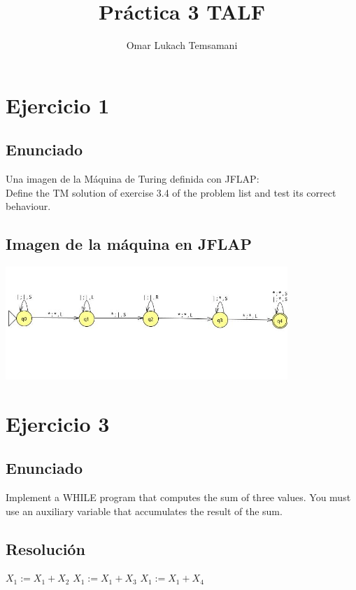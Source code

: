 \documentclass{article}
\title{Práctica 3 TALF}
\author{Omar Lukach Temsamani}
\begin{document}
\maketitle

\section{Ejercicio 1}
\subsection{Enunciado}
Una imagen de la Máquina de Turing definida con JFLAP:
\\
Define the TM solution of exercise 3.4 of the problem list and test its correct
behaviour.

\subsection{Imagen de la máquina en JFLAP}

\includegraphics[width=0.8\textwidth]{p3ej1.jpg}

\section{Ejercicio 3}

\subsection{Enunciado}
Implement a WHILE program that computes the sum of three values. You
must use an auxiliary variable that accumulates the result of the sum.

\subsection{Resolución}
\newenvironment{whilecode}
\begin{whilecode}
  $X_1 := X_1 + X_2$\;
  $X_1 := X_1 + X_3$\;
  $X_1 := X_1 + X_4$\;
\end{document}
